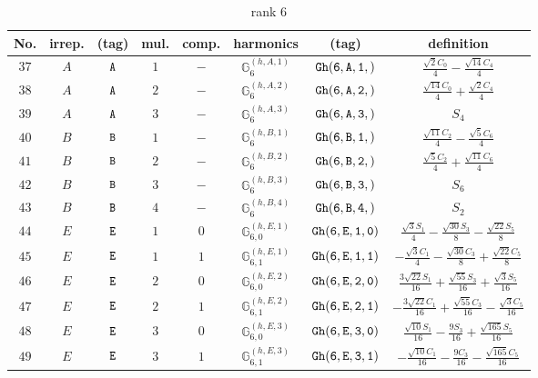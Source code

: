 \documentclass[fleqn,8pt]{jsarticle}
\begin{document}
\begin{table}[ht!]
\begin{center}
\caption{rank 6}
\renewcommand{\arraystretch}{1.3}
\begin{tabular}{cccccccc} \hline \hline
No. & irrep. & (tag) & mul. & comp. & harmonics & (tag) & definition \\ \hline
$ 37 $ & $ A $ & $ {\tt A} $ & $ 1 $ & $ - $ & $ \mathbb{G}_{6}^{(h,A,1)} $ & $ {\tt Gh(6,A,1,)} $ & $ \frac{\sqrt{2} C_{0}}{4} - \frac{\sqrt{14} C_{4}}{4} $ \\
$ 38 $ & $ A $ & $ {\tt A} $ & $ 2 $ & $ - $ & $ \mathbb{G}_{6}^{(h,A,2)} $ & $ {\tt Gh(6,A,2,)} $ & $ \frac{\sqrt{14} C_{0}}{4} + \frac{\sqrt{2} C_{4}}{4} $ \\
$ 39 $ & $ A $ & $ {\tt A} $ & $ 3 $ & $ - $ & $ \mathbb{G}_{6}^{(h,A,3)} $ & $ {\tt Gh(6,A,3,)} $ & $ S_{4} $ \\
$ 40 $ & $ B $ & $ {\tt B} $ & $ 1 $ & $ - $ & $ \mathbb{G}_{6}^{(h,B,1)} $ & $ {\tt Gh(6,B,1,)} $ & $ \frac{\sqrt{11} C_{2}}{4} - \frac{\sqrt{5} C_{6}}{4} $ \\
$ 41 $ & $ B $ & $ {\tt B} $ & $ 2 $ & $ - $ & $ \mathbb{G}_{6}^{(h,B,2)} $ & $ {\tt Gh(6,B,2,)} $ & $ \frac{\sqrt{5} C_{2}}{4} + \frac{\sqrt{11} C_{6}}{4} $ \\
$ 42 $ & $ B $ & $ {\tt B} $ & $ 3 $ & $ - $ & $ \mathbb{G}_{6}^{(h,B,3)} $ & $ {\tt Gh(6,B,3,)} $ & $ S_{6} $ \\
$ 43 $ & $ B $ & $ {\tt B} $ & $ 4 $ & $ - $ & $ \mathbb{G}_{6}^{(h,B,4)} $ & $ {\tt Gh(6,B,4,)} $ & $ S_{2} $ \\
$ 44 $ & $ E $ & $ {\tt E} $ & $ 1 $ & $ 0 $ & $ \mathbb{G}_{6,0}^{(h,E,1)} $ & $ {\tt Gh(6,E,1,0)} $ & $ \frac{\sqrt{3} S_{1}}{4} - \frac{\sqrt{30} S_{3}}{8} - \frac{\sqrt{22} S_{5}}{8} $ \\
$ 45 $ & $ E $ & $ {\tt E} $ & $ 1 $ & $ 1 $ & $ \mathbb{G}_{6,1}^{(h,E,1)} $ & $ {\tt Gh(6,E,1,1)} $ & $ - \frac{\sqrt{3} C_{1}}{4} - \frac{\sqrt{30} C_{3}}{8} + \frac{\sqrt{22} C_{5}}{8} $ \\
$ 46 $ & $ E $ & $ {\tt E} $ & $ 2 $ & $ 0 $ & $ \mathbb{G}_{6,0}^{(h,E,2)} $ & $ {\tt Gh(6,E,2,0)} $ & $ \frac{3 \sqrt{22} S_{1}}{16} + \frac{\sqrt{55} S_{3}}{16} + \frac{\sqrt{3} S_{5}}{16} $ \\
$ 47 $ & $ E $ & $ {\tt E} $ & $ 2 $ & $ 1 $ & $ \mathbb{G}_{6,1}^{(h,E,2)} $ & $ {\tt Gh(6,E,2,1)} $ & $ - \frac{3 \sqrt{22} C_{1}}{16} + \frac{\sqrt{55} C_{3}}{16} - \frac{\sqrt{3} C_{5}}{16} $ \\
$ 48 $ & $ E $ & $ {\tt E} $ & $ 3 $ & $ 0 $ & $ \mathbb{G}_{6,0}^{(h,E,3)} $ & $ {\tt Gh(6,E,3,0)} $ & $ \frac{\sqrt{10} S_{1}}{16} - \frac{9 S_{3}}{16} + \frac{\sqrt{165} S_{5}}{16} $ \\
$ 49 $ & $ E $ & $ {\tt E} $ & $ 3 $ & $ 1 $ & $ \mathbb{G}_{6,1}^{(h,E,3)} $ & $ {\tt Gh(6,E,3,1)} $ & $ - \frac{\sqrt{10} C_{1}}{16} - \frac{9 C_{3}}{16} - \frac{\sqrt{165} C_{5}}{16} $ \\
 \hline \hline
\end{tabular}
\end{center}
\end{table}
\end{document}
